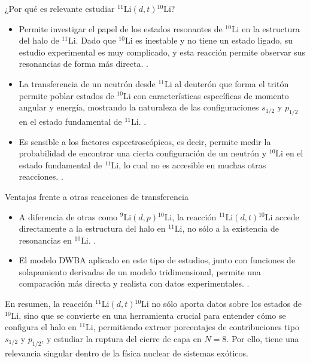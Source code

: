 ¿Por qué es relevante estudiar \({}^{11}\text{Li}(d,t){}^{10}\text{Li}\)?
\begin{itemize}
    \item Permite investigar el papel de los estados resonantes de \(^{10}\text{Li}\) en la estructura del halo de \(^{11}\text{Li}\). Dado que $^{10}\text{Li}$ es inestable y no tiene un estado ligado, su estudio experimental es muy complicado, y esta reacción permite observar sus resonancias de forma más directa. \cite{SANETULLAEV2016481}.
    
    \item La transferencia de un neutrón desde \(^{11}\text{Li}\) al deuterón que forma el tritón permite poblar estados de \(^{10}\text{Li}\) con características específicas de momento angular y energía, mostrando la naturaleza de las configuraciones \(s_{1/2}\) y \(p_{1/2}\) en el estado fundamental de \({}^{11}\text{Li}\).  \cite{CASAL2017307}. 
    
    \item Es sensible a los factores espectroscópicos, es decir, permite medir la probabilidad de encontrar una cierta configuración de un neutrón y \({}^{10}\text{Li}\) en el estado fundamental de \({}^{11}\text{Li}\), lo cual no es accesible en muchas otras reacciones. \cite{SANETULLAEV2016481}. 
\end{itemize}

Ventajas frente a otras reacciones de transferencia
\begin{itemize}
    \item A diferencia de otras como \({}^{9}\text{Li}(d,p){}^{10}\text{Li}\), la reacción \({}^{11}\text{Li}(d,t){}^{10}\text{Li}\) accede directamente a la estructura del halo en \({}^{11}\text{Li}\), no sólo a la existencia de resonancias en \({}^{10}\text{Li}\). \cite{CASAL2017307}. 
    
    \item El modelo DWBA aplicado en este tipo de estudios, junto con funciones de solapamiento derivadas de un modelo tridimensional, permite una comparación más directa y realista con datos experimentales. \cite{CASAL2017307}.
\end{itemize}


En resumen, la reacción \({}^{11}\text{Li}(d,t){}^{10}\text{Li}\) no sólo aporta datos sobre los estados de \({}^{10}\text{Li}\), sino que se convierte en una herramienta crucial para entender cómo se configura el halo en \({}^{11}\text{Li}\), permitiendo extraer porcentajes de contribuciones tipo \(s_{1/2}\) y \(p_{1/2}\), y estudiar la ruptura del cierre de capa en \(N=8\). Por ello, tiene una relevancia singular dentro de la física nuclear de sistemas exóticos.

